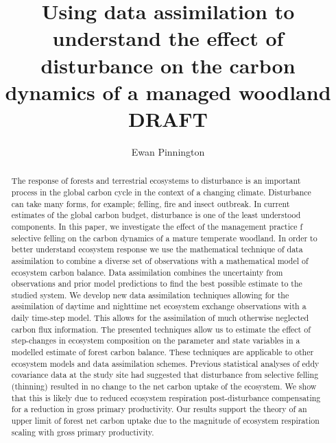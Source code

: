 \documentclass[12pt]{article}
\title{Using data assimilation to understand the effect of disturbance on the carbon dynamics of a managed woodland {\color{red} DRAFT}}
\author{Ewan Pinnington}
\begin{document}
\maketitle


\begin{abstract}
The response of forests and terrestrial ecosystems to disturbance is an important process in the global carbon cycle in the context of a changing climate. Disturbance can take many forms, for example; felling, fire and insect outbreak. In current estimates of the global carbon budget, disturbance is one of the least understood components. In this paper, we investigate the effect of the management practice f selective felling on the carbon dynamics of a mature temperate woodland. In order to better understand ecosystem response we use the mathematical technique of data assimilation to combine a diverse set of observations with a mathematical model of ecosystem carbon balance. Data assimilation combines the uncertainty from observations and prior model predictions to find the best possible estimate to the studied system. We develop new data assimilation techniques allowing for the assimilation of daytime and nighttime net ecosystem exchange observations with a daily time-step model. This allows for the assimilation of much otherwise neglected carbon flux information. The presented techniques allow us to estimate the effect of step-changes in ecosystem composition on the parameter and state variables in a modelled estimate of forest carbon balance. These techniques are applicable to other ecosystem models and data assimilation schemes. Previous statistical analyses of eddy covariance data at the study site had suggested that disturbance from selective felling (thinning) resulted in no change to the net carbon uptake of the ecosystem. We show that this is likely due to reduced ecosystem respiration post-disturbance compensating for a reduction in gross primary productivity. Our results support the theory of an upper limit of forest net carbon uptake due to the magnitude of ecosystem respiration scaling with gross primary productivity.  \end{abstract}


%
%

% 
\end{document}
